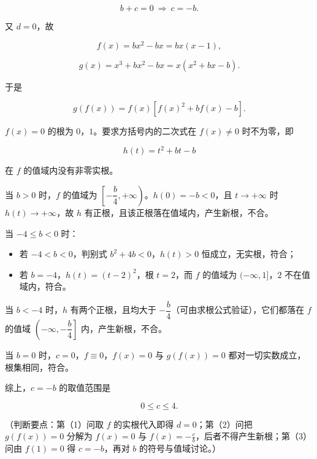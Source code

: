\begin{answer}
\nopagebreak[4]
\[b+c=0\ \Rightarrow\ c=-b.\]

又 $d=0$，故

\nopagebreak[4]
\[f(x)=bx^2-bx=bx(x-1),\]

\nopagebreak[4]
\[g(x)=x^3+bx^2-bx=x(x^2+bx-b).\]

于是

\nopagebreak[4]
\[g(f(x))=f(x)\left[f(x)^2+bf(x)-b\right].\]

$f(x)=0$ 的根为 $0$，$1$。要求方括号内的二次式在 $f(x)\neq0$ 时不为零，即

\nopagebreak[4]
\[h(t)=t^2+bt-b\]

在 $f$ 的值域内没有非零实根。

当 $b>0$ 时，$f$ 的值域为 $\left[-\dfrac b4,+\infty\right)$。$h(0)=-b<0$，且 $t\to+\infty$ 时 $h(t)\to+\infty$，故 $h$ 有正根，且该正根落在值域内，产生新根，不合。

当 $-4\leqslant b<0$ 时：

\begin{itemize}
\item 若 $-4<b<0$，判别式 $b^2+4b<0$，$h(t)>0$ 恒成立，无实根，符合；
\item 若 $b=-4$，$h(t)=(t-2)^2$，根 $t=2$，而 $f$ 的值域为 $(-\infty,1]$，$2$ 不在值域内，符合。
\end{itemize}

当 $b<-4$ 时，$h$ 有两个正根，且均大于 $-\dfrac b4$（可由求根公式验证），它们都落在 $f$ 的值域 $\left(-\infty,-\dfrac b4\right]$ 内，产生新根，不合。

当 $b=0$ 时，$c=0$，$f\equiv0$，$f(x)=0$ 与 $g(f(x))=0$ 都对一切实数成立，根集相同，符合。

综上，$c=-b$ 的取值范围是

\nopagebreak[4]
\[0\leqslant c\leqslant4.\]

（判断要点：第（1）问取 $f$ 的实根代入即得 $d=0$；第（2）问把 $g(f(x))=0$ 分解为 $f(x)=0$ 与 $f(x)=-\frac cb$，后者不得产生新根；第（3）问由 $f(1)=0$ 得 $c=-b$，再对 $b$ 的符号与值域讨论。）


\end{answer}